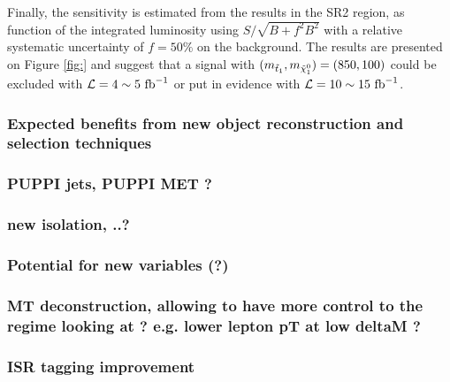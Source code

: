 

       Finally, the sensitivity is estimated from the results in the SR2 region, as function 
       of the integrated luminosity using $S / \sqrt{B + f^2 B^2}$ with a relative systematic 
       uncertainty of $f = 50\%$ on the background. The results are presented on Figure 
       \ref{fig:} and suggest that a signal with $(m_{\tilde{t}_1}, m_{\tilde{\chi}_1^0}) = (850,100)$ 
       could be excluded with $\mathcal{L} = 4\sim5~\text{fb}^{-1}$ or put in evidence with 
       $\mathcal{L} = 10\sim15~\text{fb}^{-1}$.




         \subsubsection{Expected benefits from new object reconstruction and selection techniques}

             \subsubsection{PUPPI jets, PUPPI MET ?}

             \subsubsection{new isolation, ..?}

         \subsubsection{Potential for new variables (?)}

             \subsubsection{MT deconstruction, allowing to have more control to the regime looking at ? e.g. lower lepton pT  at low deltaM ?}

             \subsubsection{ISR tagging improvement}

